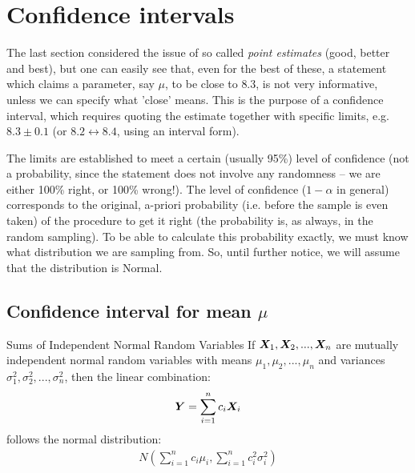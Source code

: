 \section{Confidence intervals}
The last section considered the issue of so called {\it point estimates} (good, better
and best), but one can easily see that, even for the best of these, a statement which
claims a parameter, say $\mu$, to be close to $8.3$, is not very informative, unless we
can specify what 'close' means. This is the purpose of a confidence interval,
which requires quoting the estimate together with specific limits, e.g. $8.3\pm 0.1$ (or
$8.2 \leftrightarrow  8.4$, using an interval form). 
\par
The limits are established to meet a certain (usually 95\%) level of confidence 
(not a probability, since the statement does not involve any randomness -- we are either 100\% right, or 100\% wrong!).
The level of confidence ($1-\alpha$ in general) corresponds to the original, a-priori
probability (i.e. before the sample is even taken) of the procedure to get it right
(the probability is, as always, in the random sampling). To be able to calculate
this probability exactly, we must know what distribution we are sampling from.
So, until further notice, we will assume that the distribution is Normal.

\subsection{Confidence interval for mean $\mu$}

\begin{theorem}{Sums of Independent Normal Random Variables}{}
    If $\boldsymbol{X}_1,\boldsymbol{X}_2,...,\boldsymbol{X}_n$ are mutually independent normal random variables with means 
    $\mu_1,\mu_2,...,\mu_n$ and variances $\sigma_1^2,\sigma_2^2,...,\sigma_n^2$,
    then the linear combination:
    \begin{align*}
        \boldsymbol{Y} = \sum\limits_{i=1}^{n} c_i\boldsymbol{X}_i
    \end{align*}
    follows the normal distribution:
    \begin{align*}
        N(\sum\limits_{i=1}^{n} c_i\mu_i,\sum\limits_{i=1}^{n} c_i^2\sigma_i^2)
    \end{align*}
\end{theorem}

